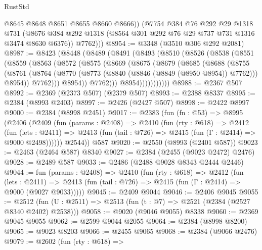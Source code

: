 \begin{lexlean}{RustStd}
\begin{coremodule}
            @8645
            @8648
            @8651
            @8655
            @8660
            @8666))
        (@7754
          @384
          @76
          @292
          @29
          @1318
          @731
          (@8676 @384 @292 @1318 (@8564 @301 @292 @76 @29 @737 @731 @1316 @3474 @8630 @6376))
          @7762)))
@8954 := @3348 (@3510 @306 @292 @2081)
@8987 := @8423
    (@8448
      (@8489
        (@8491
          (@8493
            (@8510
              (@8526
                (@8538
                  (@8551
                    (@8559
                      (@8563
                        (@8572
                          (@8575
                            (@8669
                              (@8675
                                (@8679
                                  (@8685
                                    (@8688
                                      (@8755
                                        (@8761
                                          (@8764
                                            (@8770
                                              (@8773 (@8840 (@8846 (@8849 (@8950 @8954)) @7762)))
                                              @8954))
                                          @7762)))
                                    @8954))
                                @7762)))
                          @8954)))))))))))
@8988 := @2367 @507
@8992 := @2369 (@2373 @507) (@2379 @507)
@8993 := @2388 @8337
@8995 := @2384 (@8993 @2403)
@8997 := @2426 (@2427 @507)
@8998 := @2422 @8997
@9000 := @2384 (@8998 @2451)
@9017 := @2383
    (fun (fn : @53) =>
    @8995
      (@2406
        (@2409
          (fun (params : @2408) =>
          @2410
            (fun (rty : @618) =>
            @2412
              (fun (lets : @2411) =>
              @2413 (fun (tail : @726) => @2415 (fun (Γ : @2414) => @9000 @2498))))))
        @2544))
    @587
@9020 := @2550 (@8993 (@2401 @587))
@9023 := @2463 (@2464 @587) @8340
@9027 := @2384 (@2455 (@9023 @2472) @2476)
@9028 := @2489 @587
@9033 := @2486 (@2488 @9028 @8343 @2444 @2446)
@9044 := fun (params : @2408) =>
  @2410
    (fun (rty : @618) =>
    @2412
      (fun (lets : @2411) =>
      @2413 (fun (tail : @726) => @2415 (fun (Γ : @2414) => @9000 (@9027 @9033)))))
@9045 := @2409 @9044
@9046 := @2406 @9045
@9055 := @2512 (fun (U : @2511) => @2513 (fun (t : @7) => @2521 (@2384 (@2527 @8340 @2402) @2538)))
@9058 := @9020 (@9046 @9055) @8338
@9060 := @2369 @9045 @9055
@9062 := @2599 @9044 @2055
@9064 := @2384 (@8998 @8200)
@9065 := @9023 @8203
@9066 := @2455 @9065
@9068 := @2384 (@9066 @2476)
@9079 := @2602
    (fun (rty : @618) =>

\end{coremodule}
\end{lexlean}

